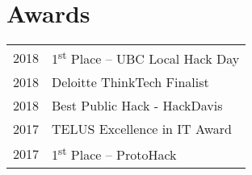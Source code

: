\documentclass[]{deedy-resume-openfont}
\begin{document}
\begin{minipage}[t]{0.3\textwidth}

\section{Awards}
\begin{tabular}{ll}
2018 & 1\textsuperscript{st} Place – UBC Local Hack Day\\
2018 & Deloitte ThinkTech Finalist\\
2018 & Best Public Hack - HackDavis \\
2017 & TELUS Excellence in IT Award \\
2017 & 1\textsuperscript{st} Place – ProtoHack \\
\end{tabular}
\sectionsep

%
%

\end{minipage}
\hfill
\end{document}
